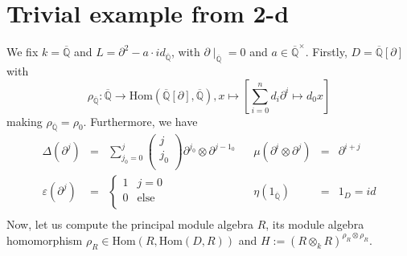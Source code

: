 \documentclass[10pt,a4paper]{article}
\newcommand{\eps}{\varepsilon}
\newcommand{\qz}{{\mathbb{Q}}}
\newcommand{\qzcl}{\overline{\qz}}
\newcommand{\bao}[1]{\begin{array}{#1}}
\newcommand{\ea}{\end{array}}
\begin{document}
\section{Trivial example from 2-d}
We fix $k = \qzcl$ and $L = \partial^2 - a \cdot id_{\qzcl}$, with $\partial\mid_{\qzcl} = 0$ and $a \in \qzcl^\times$. Firstly, $D = \qzcl[\partial]$ with
$$\rho_{\qzcl} : \qzcl \longrightarrow \mathrm{Hom}\left(\qzcl[\partial], \qzcl\right), x \longmapsto \left[\sum_{i=0}^n d_i \partial^i \longmapsto d_0 x\right]$$
making $\rho_{\qzcl} = \rho_0$. Furthermore, we have
$$\bao{rclcrcl}
\Delta(\partial^j) &=& \sum_{j_0=0}^j\left(\bao{c}j\\j_0\\\ea\right) \partial^{j_0} \otimes \partial^{j - 1_0} && \mu(\partial^i \otimes \partial^j) &=& \partial^{i + j}\\
\eps(\partial^j) &=& \begin{cases}
1 & j = 0\\
0 & \mathrm{else}\\
\end{cases} &&\eta(1_{\qzcl}) &=& 1_D = id\\
\ea$$
Now, let us compute the principal module algebra $R$, its module algebra homomorphism $\rho_R \in \mathrm{Hom}(R, \mathrm{Hom}(D, R))$ and $H := \left(R \otimes_k R\right)^{\rho_R \otimes \rho_R}$.
\end{document}
